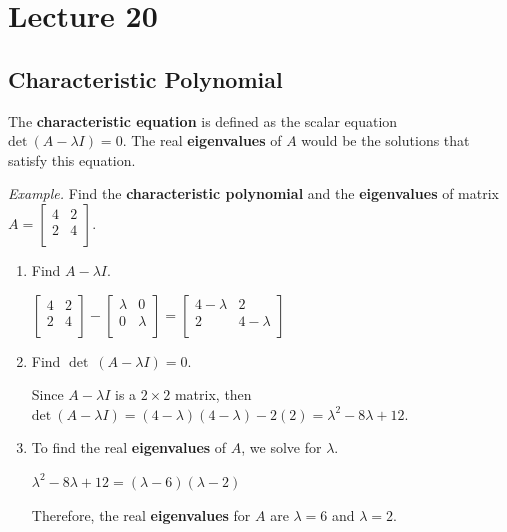 \documentclass[12pt, letterpaper]{article}
\begin{document}
  \section*{Lecture 20}

  \subsection*{Characteristic Polynomial}

  The \textbf{characteristic equation} is defined as the scalar
  equation $ \textrm{det} \: (A - \lambda I) = 0 $. The real
  \textbf{eigenvalues} of $ A $ would be the solutions that satisfy
  this equation.

  \bigskip

  \textit{Example.} Find the \textbf{characteristic polynomial} and
  the \textbf{eigenvalues} of matrix $ A =
  \begin{bmatrix}
    4 & 2 \\
    2 & 4 \\
  \end{bmatrix} $.

  \begin{enumerate}
    \item Find $ A - \lambda I $.
      \medskip

      $
      \begin{bmatrix}
        4 & 2 \\
        2 & 4 \\
      \end{bmatrix} -
      \begin{bmatrix}
        \lambda & 0 \\
        0 & \lambda \\
      \end{bmatrix} =
      \begin{bmatrix}
        4 - \lambda & 2 \\
        2 & 4 - \lambda \\
      \end{bmatrix} $
    \item Find $ \det \: (A - \lambda I) = 0 $.
      \medskip

      Since $ A - \lambda I $ is a $ 2 \times 2 $ matrix, then $
      \textrm{det} \: (A - \lambda I) = (4 - \lambda)(4 - \lambda) -
      2(2) = \lambda^2 - 8\lambda + 12 $.
    \item To find the real \textbf{eigenvalues} of $ A $, we solve
      for $ \lambda $.
      \medskip

      $ \lambda^2 - 8\lambda + 12 = (\lambda - 6)(\lambda - 2) $
      \medskip

      Therefore, the real \textbf{eigenvalues} for $ A $ are $
      \lambda = 6 $ and $ \lambda = 2 $.
  \end{enumerate}
\end{document}
